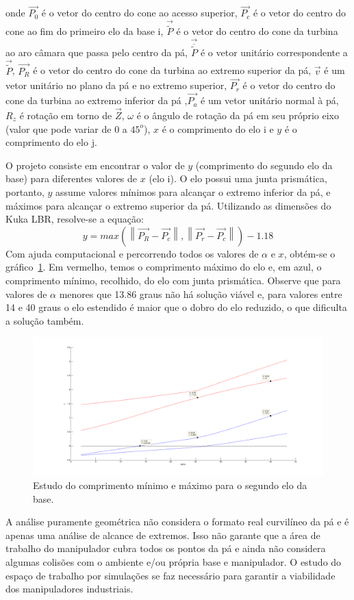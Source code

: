 onde $\overrightarrow{P_0}$ é o vetor do centro do cone ao acesso superior,
$\overrightarrow{P_c}$ é o vetor do centro do cone ao fim do primeiro elo da
base i, $\overrightarrow{\widetilde{P}}$ é o vetor do centro do cone da turbina
ao aro câmara que passa pelo centro da pá,
$\overrightarrow{\overline{\widetilde{P}}}$ é o vetor unitário correspondente a
$\overrightarrow{\widetilde{P}}$, $\overrightarrow{P_R}$ é o vetor do centro do cone da turbina
ao extremo superior da pá, $\overrightarrow{v}$ é um vetor unitário no plano da
pá e no extremo superior, $\overrightarrow{P_r}$ é o vetor do centro do cone da
turbina ao extremo inferior da pá ,$\overrightarrow{P_a}$ é um vetor unitário
normal à pá, $R_z$ é rotação em torno de $\overrightarrow{Z}$, $\omega$ é o
ângulo de rotação da pá em seu próprio eixo (valor que pode variar de $0$ a
$45^o$), $x$ é o comprimento do elo i e $y$ é o comprimento do elo j.

O projeto consiste em encontrar o valor de $y$ (comprimento do segundo elo da
base) para diferentes valores de $x$ (elo i). O elo possui uma junta
prismática, portanto, $y$ assume valores mínimos para alcançar o extremo
inferior da pá, e máximos para alcançar o extremo superior da pá.
Utilizando as dimensões do Kuka LBR, resolve-se a equação: 
$$y = max (\left \|
\overrightarrow{P_R}-\overrightarrow{P_c} \right \|, \left \|
\overrightarrow{P_r}-\overrightarrow{P_c} \right \|) - 1.18$$ 
Com ajuda computacional e percorrendo todos os valores de  $\alpha$ e $x$,
obtém-se o gráfico~\ref{yminsmallhatch}. Em vermelho, temos o comprimento máximo do elo e,
em azul, o comprimento mínimo, recolhido, do elo com junta prismática. Observe
que para valores de $\alpha$ menores que 13.86 graus não há solução viável e,
para valores entre 14 e 40 graus o elo estendido é maior que o dobro do elo
reduzido, o que dificulta a solução também.

\begin{figure}[h!]
\centering
	\includegraphics[width=\columnwidth]{figs/estudo/geometrico/yminsmallhatch.png} 
	\caption{Estudo do comprimento mínimo e máximo para o segundo elo da base.}
	\label{yminsmallhatch}
\end{figure}

A análise puramente geométrica não considera o formato real curvilíneo da pá e
é apenas uma análise de alcance de extremos. Isso não garante que a área de
trabalho do manipulador cubra todos os pontos da pá e ainda não considera
algumas colisões com o ambiente e/ou própria base e manipulador. O estudo do
espaço de trabalho por simulações se faz necessário para garantir a viabilidade
dos manipuladores industriais.